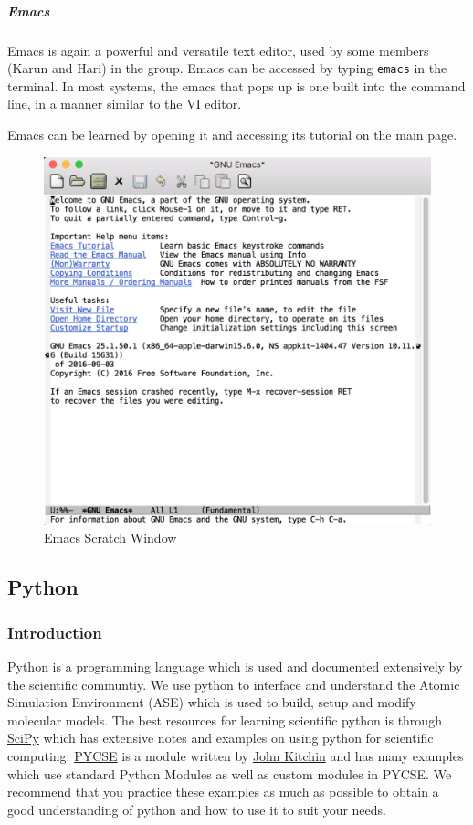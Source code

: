 \documentclass[11pt]{article}
\makeatletter
\def\maxwidth{\ifdim\Gin@nat@width>\linewidth\linewidth
    \else\Gin@nat@width\fi}
\let\Oldincludegraphics\includegraphics
\renewcommand{\includegraphics}[1]{\Oldincludegraphics[width=.8\maxwidth]{#1}}
\makeatother
\begin{document}
\subparagraph{Emacs}\label{emacs}

Emacs is again a powerful and versatile text editor, used by some
members (Karun and Hari) in the group. Emacs can be accessed by typing
\texttt{emacs} in the terminal. In most systems, the emacs that pops up
is one built into the command line, in a manner similar to the VI
editor.

Emacs can be learned by opening it and accessing its tutorial on the
main page.

\begin{figure}
\centering
\includegraphics{figures/emacs.png}
\caption{Emacs Scratch Window}
\end{figure}

    \subsection{Python}\label{python}

\subsubsection{Introduction}\label{introduction}

Python is a programming language which is used and documented
extensively by the scientific communtiy. We use python to interface and
understand the Atomic Simulation Environment (ASE) which is used to
build, setup and modify molecular models. The best resources for
learning scientific python is through
\href{http://www.scipy-lectures.org/}{SciPy} which has extensive notes
and examples on using python for scientific computing.
\href{http://kitchingroup.cheme.cmu.edu/pycse/pycse.html}{PYCSE} is a
module written by \href{http://kitchingroup.cheme.cmu.edu/}{John
Kitchin} and has many examples which use standard Python Modules as well
as custom modules in PYCSE. We recommend that you practice these
examples as much as possible to obtain a good understanding of python
and how to use it to suit your needs.
\end{document}

